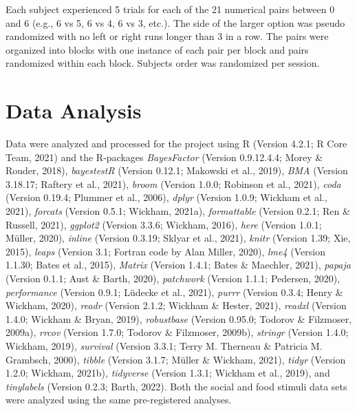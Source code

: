 \documentclass[
  ,doc,floatsintext]{apa6}
\begin{document}
Each subject experienced 5 trials for each of the 21 numerical pairs between 0 and 6 (e.g., 6 vs 5, 6 vs 4, 6 vs 3, etc.). The side of the larger option was pseudo randomized with no left or right runs longer than 3 in a row. The pairs were organized into blocks with one instance of each pair per block and pairs randomized within each block. Subjects order was randomized per session.

\hypertarget{data-analysis}{%
\section{Data Analysis}\label{data-analysis}}

Data were analyzed and processed for the project using R (Version 4.2.1; R Core Team, 2021) and the R-packages \emph{BayesFactor} (Version 0.9.12.4.4; Morey \& Rouder, 2018), \emph{bayestestR} (Version 0.12.1; Makowski et al., 2019), \emph{BMA} (Version 3.18.17; Raftery et al., 2021), \emph{broom} (Version 1.0.0; Robinson et al., 2021), \emph{coda} (Version 0.19.4; Plummer et al., 2006), \emph{dplyr} (Version 1.0.9; Wickham et al., 2021), \emph{forcats} (Version 0.5.1; Wickham, 2021a), \emph{formattable} (Version 0.2.1; Ren \& Russell, 2021), \emph{ggplot2} (Version 3.3.6; Wickham, 2016), \emph{here} (Version 1.0.1; Müller, 2020), \emph{inline} (Version 0.3.19; Sklyar et al., 2021), \emph{knitr} (Version 1.39; Xie, 2015), \emph{leaps} (Version 3.1; Fortran code by Alan Miller, 2020), \emph{lme4} (Version 1.1.30; Bates et al., 2015), \emph{Matrix} (Version 1.4.1; Bates \& Maechler, 2021), \emph{papaja} (Version 0.1.1; Aust \& Barth, 2020), \emph{patchwork} (Version 1.1.1; Pedersen, 2020), \emph{performance} (Version 0.9.1; Lüdecke et al., 2021), \emph{purrr} (Version 0.3.4; Henry \& Wickham, 2020), \emph{readr} (Version 2.1.2; Wickham \& Hester, 2021), \emph{readxl} (Version 1.4.0; Wickham \& Bryan, 2019), \emph{robustbase} (Version 0.95.0; Todorov \& Filzmoser, 2009a), \emph{rrcov} (Version 1.7.0; Todorov \& Filzmoser, 2009b), \emph{stringr} (Version 1.4.0; Wickham, 2019), \emph{survival} (Version 3.3.1; Terry M. Therneau \& Patricia M. Grambsch, 2000), \emph{tibble} (Version 3.1.7; Müller \& Wickham, 2021), \emph{tidyr} (Version 1.2.0; Wickham, 2021b), \emph{tidyverse} (Version 1.3.1; Wickham et al., 2019), and \emph{tinylabels} (Version 0.2.3; Barth, 2022). Both the social and food stimuli data sets were analyzed using the same pre-registered analyses.
\end{document}
